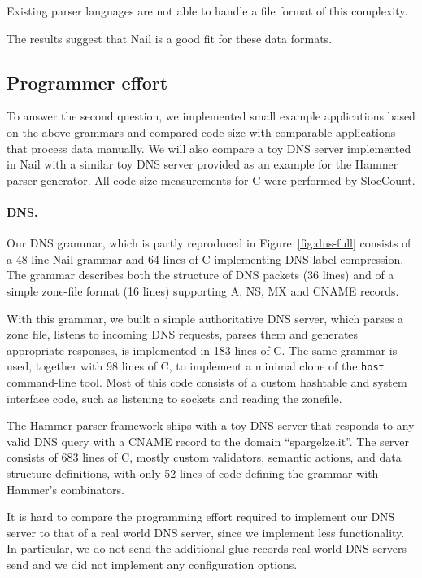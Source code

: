 Existing parser languages are not able to handle a file format of this complexity.

\noindent The results suggest that Nail is a good fit for these data formats. 



\subsection{Programmer effort}


\label{s:eval-effort}
To answer the second question, we implemented small example applications based on the above
grammars and compared code size with comparable applications that process data manually. We will
also compare a toy DNS server implemented in Nail with a similar toy DNS server provided as an
example for the Hammer parser generator. All code size measurements for C were performed by
SlocCount\cite{sloccount}.

\paragraph{DNS.}

Our DNS grammar, which is partly reproduced in Figure~\ref{fig:dns-full} consists of a 48 line  Nail
grammar and 64 lines of C implementing DNS label compression.
The grammar describes both the structure of DNS packets (36 lines) and of a simple zone-file format
(16 lines) supporting A, NS, MX and CNAME records. 

  
With this grammar, we built a simple authoritative DNS server, which parses a zone file, listens to incoming DNS
requests, parses them and generates appropriate responses, is implemented in 183 lines of C. The
same grammar is used, together with 98 lines of C, to implement a minimal clone of the
\texttt{host} command-line tool. Most of this code consists of a custom hashtable and system
interface code, such as listening to sockets and reading the zonefile. 

The Hammer parser framework\cite{hammer-dns} ships with a toy DNS server that responds to
any valid DNS query with a CNAME record to the domain ``spargelze.it''. 
The server consists of 683 lines of C, mostly custom validators, semantic actions,
and data structure definitions, with only 52 lines of code defining the
grammar with Hammer's combinators.

It is hard to compare the programming effort required to implement
our DNS server to that of a real world DNS server, since we implement less functionality.
 In particular, we do not send the additional glue records real-world DNS servers send and
we did not implement any configuration options.

